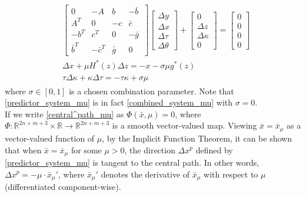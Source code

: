 \documentclass[10pt]{article}
\theoremstyle{definition}
\theoremstyle{plain}
\begin{document}
\begin{align}\label{combined_system_mu}
\begin{split}
&\begin{bmatrix}
0 & -A & b & -\bar b\ \\ 
A^T & 0 & -c & \bar c \\
-b^T & c^T& 0 & -\bar g \\
\bar b^T & -\bar c^T & \bar g & 0
\end{bmatrix}
\begin{bmatrix}
\Delta y \\ \Delta x \\ \Delta \tau \\ \Delta \theta
\end{bmatrix} + 
\begin{bmatrix}
0 \\ \Delta z \\ \Delta \kappa \\ 0 
\end{bmatrix} = 
\begin{bmatrix}
0 \\ 0 \\ 0 \\ 0
\end{bmatrix} \\ 
&\Delta{x} + \mu H^*(z)\Delta{z} = -x - \sigma \mu g^*(z) \\
& \tau \Delta \kappa + \kappa \Delta\tau = -\tau\kappa + \sigma \mu
\end{split}
\end{align}
where $\sigma \in \left[0,1\right]$ is a chosen combination parameter. Note that \eqref{predictor_system_mu} is in fact \eqref{combined_system_mu} with $\sigma = 0$.\\

If we write \eqref{central^path_mu} as $\Phi(\bar{x}, \mu) = 0$, where $\Phi: \mathbb{R}^{2n+m+3}\times \mathbb{R}\rightarrow \mathbb{R}^{2n+m+3}$ is a smooth vector-valued map. Viewing $\bar{x} = \bar{x}_\mu$ as a vector-valued function of $\mu$, by the Implicit Function Theorem, it can be shown that when $\bar{x} = \bar{x}_\mu$ for some $\mu > 0$, the direction $\Delta{x}^p$ defined by \eqref{predictor_system_mu} is tangent to the central path. In other words, $\Delta x^p = -\mu\cdot  \bar x_\mu'$, where $\bar x_\mu'$ denotes the derivative of $\bar x_\mu$ with respect to $\mu$ (differentiated component-wise). \\
\end{document}
